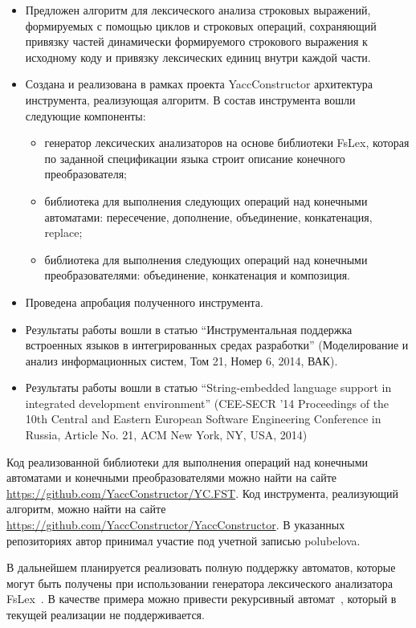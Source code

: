 \documentclass{matmex-diploma}
\begin{document}
\begin{itemize}
\item Предложен алгоритм для лексического анализа строковых выражений, формируемых с помощью циклов и строковых операций, сохраняющий привязку частей динамически формируемого строкового выражения к исходному коду и привязку лексических единиц внутри каждой части.
\item Создана и реализована в рамках проекта YaccConstructor архитектура инструмента, реализующая алгоритм. В состав инструмента вошли следующие компоненты: 
\begin{itemize}
\item генератор лексических анализаторов на основе библиотеки FsLex, которая по заданной спецификации языка строит описание конечного преобразователя;
\item библиотека для выполнения следующих операций над конечными автоматами: пересечение, дополнение, объединение, конкатенация, replace;
\item библиотека для выполнения следующих операций над конечными преобразователями: объединение, конкатенация и композиция.
\end{itemize}
\item Проведена апробация полученного инструмента.
\item Результаты работы вошли в статью ``Инструментальная поддержка встроенных языков в
интегрированных средах разработки'' (Моделирование и анализ информационных систем, Том 21, Номер 6, 2014, ВАК).
\item Результаты работы вошли в статью ``String-embedded language support in integrated development environment'' (CEE-SECR '14 Proceedings of the 10th Central and Eastern European Software Engineering Conference in Russia, Article No. 21, ACM New York, NY, USA, 2014)
\end{itemize}

Код реализованной библиотеки для выполнения операций над конечными автоматами и конечными преобразователями можно найти на сайте \url{https://github.com/YaccConstructor/YC.FST}. Код инструмента, реализующий алгоритм, можно найти на сайте \url{https://github.com/YaccConstructor/YaccConstructor}. В указанных репозиториях автор принимал участие под учетной записью polubelova.


В дальнейшем планируется реализовать полную поддержку автоматов, которые могут быть получены при использовании генератора лексического анализатора FsLex~\cite{FsLex}. В качестве примера можно привести рекурсивный автомат~\cite{Tellier06learningrecursive}, который в текущей реализации не поддерживается. 
\end{document}
